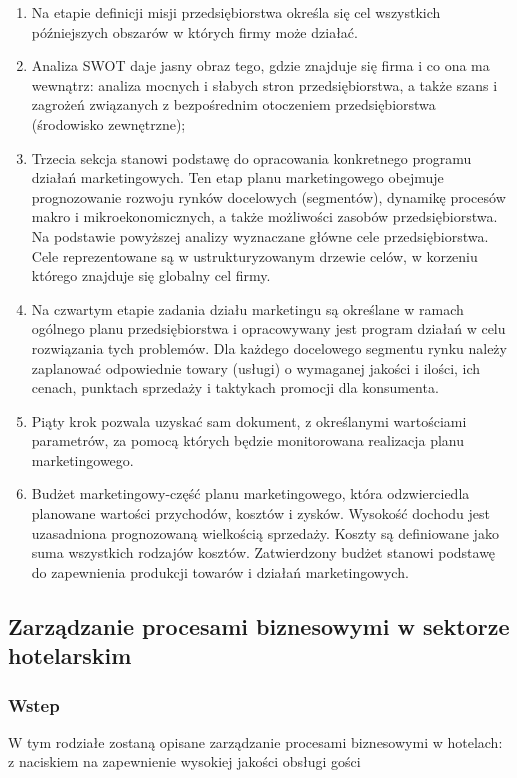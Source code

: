 \documentclass[a4paper, 12pt]{article}
\begin{document}
\begin{enumerate}
	\item Na etapie definicji misji przedsiębiorstwa określa się cel wszystkich późniejszych obszarów w których firmy może działać.
	\item Analiza SWOT daje jasny obraz tego, gdzie znajduje się firma i co ona ma wewnątrz: analiza mocnych i słabych stron przedsiębiorstwa, a także szans i zagrożeń związanych z bezpośrednim otoczeniem przedsiębiorstwa (środowisko zewnętrzne);
	\item Trzecia sekcja stanowi podstawę do opracowania konkretnego programu działań marketingowych. Ten etap planu marketingowego obejmuje prognozowanie rozwoju rynków docelowych (segmentów), dynamikę procesów makro i mikroekonomicznych, a także możliwości zasobów przedsiębiorstwa. Na podstawie powyższej analizy wyznaczane główne cele  przedsiębiorstwa. Cele reprezentowane są w ustrukturyzowanym drzewie celów, w korzeniu którego znajduje się globalny cel firmy.
	\item Na czwartym etapie zadania działu marketingu są określane w ramach ogólnego planu przedsiębiorstwa i opracowywany jest program działań w celu rozwiązania tych problemów. Dla każdego docelowego segmentu rynku należy zaplanować odpowiednie towary (usługi) o wymaganej jakości i ilości, ich cenach, punktach sprzedaży i taktykach promocji dla konsumenta.
	\item Piąty krok pozwala uzyskać sam dokument, z określanymi wartościami parametrów, za pomocą których będzie monitorowana realizacja planu marketingowego.
	\item Budżet marketingowy-część planu marketingowego, która odzwierciedla planowane wartości przychodów, kosztów i zysków. Wysokość dochodu jest uzasadniona prognozowaną wielkością sprzedaży. Koszty są definiowane jako suma wszystkich rodzajów kosztów. Zatwierdzony budżet stanowi podstawę do zapewnienia produkcji towarów i działań marketingowych.
\end{enumerate}








\subsection{Zarządzanie procesami biznesowymi w sektorze hotelarskim}
\subsubsection{Wstep}
\hspace*{1 cm} W tym rodziałe zostaną opisane zarządzanie procesami biznesowymi w hotelach: z naciskiem na zapewnienie wysokiej jakości obsługi gości
\end{document}
